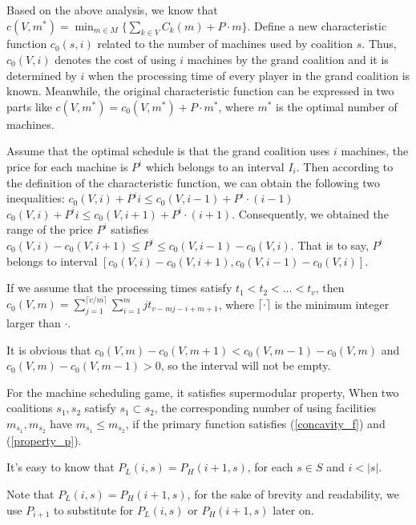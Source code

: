 Based on the above analysis, we know that $c(V,m^*) = \min_{m \in M} \{\sum_{k\in V}{C_k(m)}+ P\cdot m\}$.
Define a new characteristic function $c_0(s,i)$
related to the number of machines used by coalition $s$. Thus, $c_0(V,i)$ denotes the cost of using $i$ machines by the grand coalition and it is determined by $i$ when the processing time of every player in the grand coalition is known.
Meanwhile, the original characteristic function can be expressed in two parts like $c(V,m^*) = c_0(V,m^*) + P\cdot m^*$, where $m^*$ is the optimal number of machines.

Assume that the optimal schedule is that the grand coalition uses $i$ machines, the price for each machine is $P^i$ which belongs to an interval $I_i$.
Then according to the definition of the characteristic function, we can obtain the following two inequalities:
$c_0 (V,i) + P^i i \leq c_0 (V,i-1) + P^i\cdot(i-1)$
$c_0 (V,i) + P^i i \leq c_0 (V,i+1) + P^i\cdot(i+1)$.
Consequently, we obtained the range of the price $P^i$ satisfies $c_0 (V,i) - c_0 (V,i+1) \leq P^i \leq c_0 (V,i-1) - c_0 (V,i)$.
That is to say, $P^i$ belongs to interval $[c_0 (V,i) - c_0 (V,i+1), c_0 (V,i-1) - c_0 (V,i)].$

If we assume that the processing times satisfy $t_1 < t_2 < \ldots < t_v$, then $c_0(V,m) =
\sum_{j=1}^{\lceil v/m \rceil} \sum_{i=1}^m j t_{v-mj-i+m+1}$, where $\lceil \cdot \rceil$ is the minimum integer larger than $\cdot$.

It is obvious that $c_0 (V,m) - c_0 (V,m+1) < c_0 (V,m-1) - c_0 (V,m)$ and $c_0(V,m)- c_0(V,m-1) > 0$, so the interval will not be empty.

\begin{lem}\label{lem1}
For the machine scheduling game, it satisfies supermodular property,
When two coalitions $s_1,s_2$ satisfy $s_1 \subset s_2$, the corresponding number of using facilities $ m_{s_1}, m_{s_2}$ have $m_{s_1} \leq m_{s_2}$, if the primary function satisfies  (\ref{concavity_f}) and (\ref{property_p}).
\end{lem}

\begin{remark}
  It's easy to know that $P_L(i,s) = P_H(i+1,s)$, for each $s \in S$ and $ i <|s|$.
\end{remark}

\begin{remark}
  Note that $P_L(i,s) = P_H(i+1,s)$, for the sake of brevity and readability, we use $P_{i+1}$ to substitute for $P_L(i,s)$ or $P_H(i+1,s)$ later on.
\end{remark}

